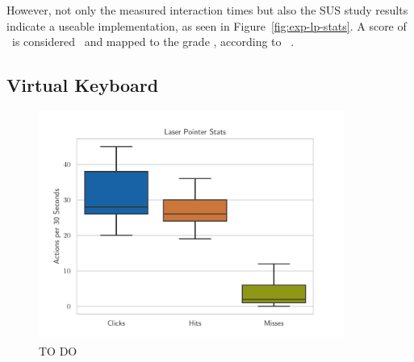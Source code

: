However, not only the measured interaction times but also the \ac{SUS} study results indicate a useable implementation, as seen in Figure~\ref{fig:exp-lp-stats}. A score of \evalExpLpSusScore\ is considered \evalExpLpSusAdj\ and mapped to the grade \evalExpLpSusGrade, according to \citeauthor{Bangor.2009}~\cite{Bangor.2009}.



\subsection{Virtual Keyboard}\label{section:eval-res-vk}


\begin{figure}[H]
  \centering
  \includegraphics[width=10cm]{figures/evaluation/eval_exp_lp.pdf}
  \caption[TO DO]{TO DO}\label{fig:eval-exp-vk}
\end{figure}


